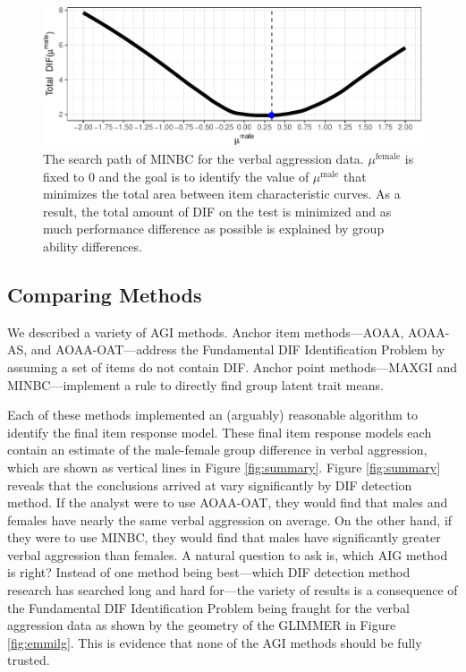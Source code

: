 \documentclass[
  english,
  man,floatsintext]{apa6}
\begin{document}
\begin{figure}[h]

{\centering \includegraphics{paper_apa_files/figure-latex/minbc-1} 

}

\caption{The search path of MINBC for the verbal aggression data. $\mu^\text{female}$ is fixed to 0 and the goal is to identify the value of $\mu^\text{male}$ that minimizes the total area between item characteristic curves. As a result, the total amount of DIF on the test is minimized and as much performance difference as possible is explained by group ability differences.}\label{fig:minbc}
\end{figure}

\hypertarget{comparing-methods}{%
\subsection{Comparing Methods}\label{comparing-methods}}

We described a variety of AGI methods. Anchor item methods---AOAA, AOAA-AS, and AOAA-OAT---address the Fundamental DIF Identification Problem by assuming a set of items do not contain DIF. Anchor point methods---MAXGI and MINBC---implement a rule to directly find group latent trait means.

Each of these methods implemented an (arguably) reasonable algorithm to identify the final item response model. These final item response models each contain an estimate of the male-female group difference in verbal aggression, which are shown as vertical lines in Figure \ref{fig:summary}. Figure \ref{fig:summary} reveals that the conclusions arrived at vary significantly by DIF detection method. If the analyst were to use AOAA-OAT, they would find that males and females have nearly the same verbal aggression on average. On the other hand, if they were to use MINBC, they would find that males have significantly greater verbal aggression than females. A natural question to ask is, which AIG method is right? Instead of one method being best---which DIF detection method research has searched long and hard for---the variety of results is a consequence of the Fundamental DIF Identification Problem being fraught for the verbal aggression data as shown by the geometry of the GLIMMER in Figure \ref{fig:emmilg}. This is evidence that none of the AGI methods should be fully trusted.
\end{document}
